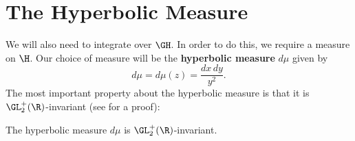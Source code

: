     \section{The Hyperbolic Measure}
      We will also need to integrate over $\GH$. In order to do this, we require a measure on $\H$. Our choice of measure will be the \textbf{hyperbolic measure} $d\mu$ given by
      \[
        d\mu = d\mu(z) = \frac{dx\,dy}{y^{2}}.
      \]
      The most important property about the hyperbolic measure is that it is $\GL_{2}^{+}(\R)$-invariant (see \cite{diamond2005first} for a proof):

      \begin{proposition}
        The hyperbolic measure $d\mu$ is $\GL_{2}^{+}(\R)$-invariant.
      \end{proposition}

